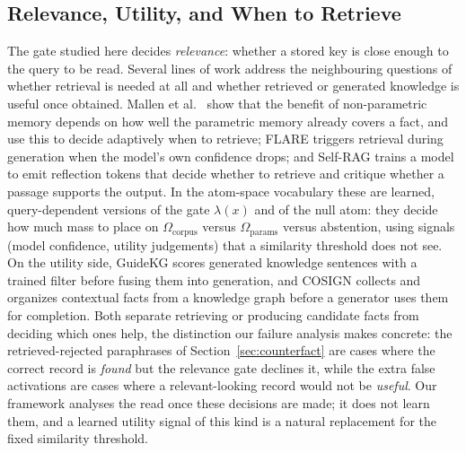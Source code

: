 \documentclass[preprint,12pt]{elsarticle}
\newcommand{\Om}{\Omega}
\newif\ifmarkchanges
\newcommand{\rev}[1]{\ifmarkchanges{\color{blue}#1}\else#1\fi}
\begin{document}
\subsection{Relevance, Utility, and When to Retrieve}
\rev{The gate studied here decides \emph{relevance}: whether a stored key is close enough to the query to be read. Several lines of work address the neighbouring questions of whether retrieval is needed at all and whether retrieved or generated knowledge is useful once obtained. Mallen et al.\ \cite{mallen2023trust} show that the benefit of non-parametric memory depends on how well the parametric memory already covers a fact, and use this to decide adaptively when to retrieve; FLARE \cite{jiang2023active} triggers retrieval during generation when the model's own confidence drops; and Self-RAG \cite{asai2024selfrag} trains a model to emit reflection tokens that decide whether to retrieve and critique whether a passage supports the output. In the atom-space vocabulary these are learned, query-dependent versions of the gate $\lambda(x)$ and of the null atom: they decide how much mass to place on $\Om_{\mathrm{corpus}}$ versus $\Om_{\mathrm{params}}$ versus abstention, using signals (model confidence, utility judgements) that a similarity threshold does not see. On the utility side, GuideKG \cite{wei2024guidekg} scores generated knowledge sentences with a trained filter before fusing them into generation, and COSIGN \cite{li2024cosign} collects and organizes contextual facts from a knowledge graph before a generator uses them for completion. Both separate retrieving or producing candidate facts from deciding which ones help, the distinction our failure analysis makes concrete: the retrieved-rejected paraphrases of Section~\ref{sec:counterfact} are cases where the correct record is \emph{found} but the relevance gate declines it, while the extra false activations are cases where a relevant-looking record would not be \emph{useful}. Our framework analyses the read once these decisions are made; it does not learn them, and a learned utility signal of this kind is a natural replacement for the fixed similarity threshold.}
\end{document}
